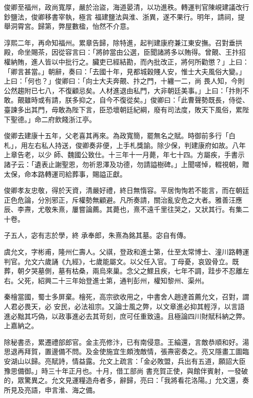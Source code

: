 \begin{pinyinscope}
 俊卿至福州，政尚寬厚，嚴於治盜，海道晏清，以功進秩。轉運判官陳峴建議改行鈔鹽法，俊卿移書宰執，極言
 福建鹽法與淮、浙異，遂不果行。明年，請祠，提舉洞霄宮。歸第，弊屋數楹，怡然不介意。



 淳熙二年，再命知福州。累章告歸，除特進，起判建康府兼江東安撫。召對垂拱殿，命坐賜茶，因從容言曰：「將帥當由公選，臣聞諸將多以賄得。曾覿、王抃招權納賄，進人皆以中批行之。臟吏已經結勘，而內批改正，將何所勸懲？」上曰：「卿言甚當。」朝辭，奏曰：「去國十年，見都城穀賤人安，惟士大夫風俗大變。」上曰：「何也？」俊卿曰：「向士大夫奔覿、抃之門，十纏一二，尚
 畏人知，今則公然趨附已七八，不復顧忌矣。人材進退由私門，大非朝廷美事。」上曰：「抃則不敢。覿雖時或有請，朕多抑之，自今不復從矣。」俊卿曰：「此曹聲勢既長，侍從、臺諫多出其門，毋敢為陛下言，臣恐壞朝廷紀綱，廢有司法度，敗天下風俗，累陛下聖德。」命二府飲餞浙江亭。



 俊卿去建康十五年，父老喜其再來。為政寬簡，罷無名之賦。時御前多行「白札」，用左右私人持送，俊卿奏非便，上手札獎諭。除少保，判建康府如故。八年上章告老，以少
 師、魏國公致仕。十三年十一月薨，年七十四。方屬疾，手書示諸子云：「遺表止謝聖恩，勿祈恩澤及功德，勿請謚樹碑。」上聞嗟悼，輟視朝，贈太保，命本路轉運司給葬事，賜謚正獻。



 俊卿孝友忠敬，得於天資，清嚴好禮，終日無惰容。平居恂恂若不能言，而在朝廷正色危論，分別邪正，斥權勢無顧避。凡所奏請，關治亂安危之大者。雅善汪應辰、李燾，尤敬朱熹，屢嘗論薦。其薨也，熹不遠千里往哭之，又狀其行。有集二十卷。



 子五人，宓有志於學，終
 承奉郎，朱熹為銘其墓。宓自有傳。



 虞允文，字彬甫，隆州仁壽人。父祺，登政和進士第，仕至太常博士、潼川路轉運判官。允文六歲誦《九經》，七歲能屬文。以父任入官。丁母憂，哀毀骨立。既葬，朝夕哭墓側，墓有枯桑，兩烏來巢。念父之鰥且疾，七年不調，跬步不忍離左右。父死，紹興二十三年始登進士第，通判彭州，權知黎州、渠州。



 秦檜當國，蜀士多屏棄。檜死，高宗欲收用之，中書舍人趙達首薦允文，召對，謂人君必畏天，必
 安民，必法祖宗。又論士風之弊，以文章進必抑其輕浮，以言語進必黜其巧偽，以政事進必去其苛刻，庶可任重致遠。且極論四川財賦科納之弊。上嘉納之。



 除秘書丞，累遷禮部郎官。金主亮修汴，已有南侵意。王綸還，言敵恭順和好。湯思退再拜賀，置邊備不問。及金使施宜生頗洩敵情，張燾密奏之。亮又隱畫工圖臨安湖山以歸。亮賦詩，情益露。允文上疏言：「金必敗盟，兵出有五道，願詔大臣豫思備御。」時三十年正月也。十月，借工部尚
 書充賀正使，與館伴賓射，一發破的，眾驚異之。允文見運糧造舟者多，辭歸，亮曰：「我將看花洛陽。」允文還，奏所見及亮語，申言淮、海之備。




\end{pinyinscope}
